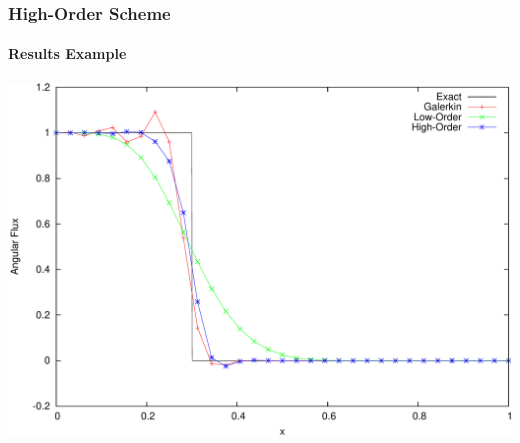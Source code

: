 \documentclass{beamer}
\begin{document}
\begin{frame}
\frametitle{High-Order Scheme}
\framesubtitle{Results Example}

\includegraphics[width=\textwidth]{./figures/advection_high_order.pdf}

\end{frame}
\end{document}
